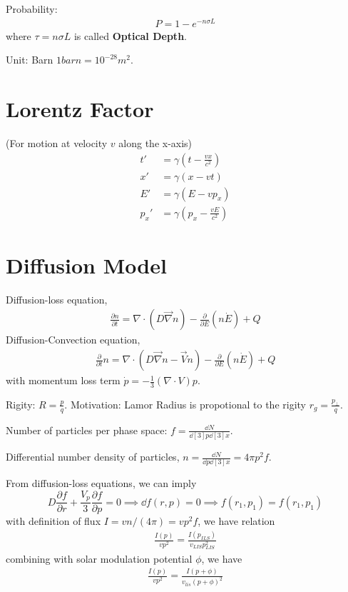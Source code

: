 \documentclass{sciposter}
\begin{document}
\begin{multicols}{3}
Probability:
\begin{align}
    P=1-e^{-n\sigma L} 
\end{align}
where $\tau=n\sigma L$ is called \textbf{Optical Depth}.

Unit: Barn $1 barn = 10^{-28}m^{2}  $.


\section{Lorentz Factor}

(For motion at velocity $v$ along the x-axis)
\begin{align}
    t' &= \gamma \left(t - \frac{vx}{c^2}\right) \\
    x' &= \gamma (x - vt) \\
    E' &= \gamma (E - vp_x) \\
    p_x' &= \gamma \left(p_x - \frac{vE}{c^2}\right) 
\end{align}



\section{Diffusion Model}

Diffusion-loss equation,
\begin{align}
    \frac{\partial n}{\partial t}=\nabla \cdot \left(D \vec{\nabla}n\right)-\frac{\partial}{\partial E}(n\dot{E})+Q
\end{align}
Diffusion-Convection equation,
\begin{align}
    \frac{\partial}{\partial t}n=\nabla \cdot \left(D\vec{\nabla}n-\vec{V}n\right)-\frac{\partial }{\partial E}(n\dot{E})+Q
\end{align}
with momentum loss term $\dot{p}=-\frac{1}{3}(\nabla \cdot V)p$.

Rigity: $R=\frac{p}{q}$. Motivation: Lamor Radius is propotional to the rigity $r_{g}=\frac{p_{\bot } }{q} $.

Number of particles per phase space: $f=\frac{\dd{N}}{\dd[3]{p}\dd[3]{x}}$.

Differential number density of particles, $n=\frac{\dd{N}}{\dd{p}\dd[3]{x}}=4\pi p^{2}f $.

From diffusion-loss equations, we can imply $$D\frac{\partial f}{\partial r}+\frac{V_{p} }{3}\frac{\partial f}{\partial p}=0 \implies \dd{f}(r,p)=0 \implies f(r_{1},p_{1}  )=f(r_{1},p_{1}  )  $$ 
with definition of flux $I=v n/(4 \pi)=vp^{2}f  $, we have relation
\begin{align}
    \frac{I(p)}{v p^{2} }=\frac{I(p_{ILS} ) }{v_{LIS}p_{LIS}^{2}   }
\end{align}
combining with solar modulation potential $\phi$, we have 
\begin{align}
    \frac{I(p)}{v p^{2} }=\frac{I(p+\phi ) }{v_{lis}(p+\phi)^{2}    }
\end{align}


\end{multicols}
\end{document}

